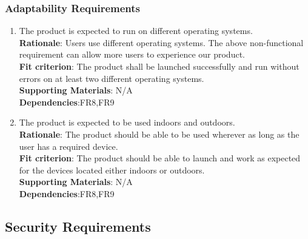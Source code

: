 \documentclass{article}
\begin{document}
\subsubsection{Adaptability Requirements}
\begin{enumerate}[MS3.1]
    \item The product is expected to run on different 
    operating systems.\\
    \textbf{Rationale}: Users use different operating systems. The above 
    non-functional requirement can allow more users to experience our product.\\
    \textbf{Fit criterion}: The product shall be launched successfully and run without errors on at
     least two different operating systems.\\
\textbf{Supporting Materials}: N/A\\
\textbf{Dependencies}:FR8,FR9\\
    
    \item The product is expected to be used indoors and outdoors.\\
    \textbf{Rationale}: The product should be able to be used wherever as long as the user has a
     required device.\\
    \textbf{Fit criterion}: The product should be able to launch and work as expected for the devices
     located either indoors or outdoors.\\
\textbf{Supporting Materials}: N/A\\
\textbf{Dependencies}:FR8,FR9\\

\end{enumerate}
\subsection{Security Requirements}
\end{document}
